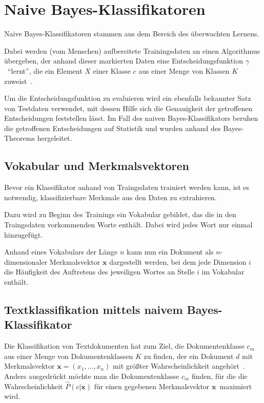\section{Naive Bayes-Klassifikatoren}\label{sec:theory}
    Naive Bayes-Klassifikatoren stammen aus dem Bereich des überwachten Lernens. 

    Dabei werden (vom Menschen) aufbereitete Trainingsdaten an einen Algorithmus übergeben, der anhand dieser markierten Daten eine Entscheidungsfunktion $\gamma$~``lernt'', die ein Element $X$ einer Klasse $c$ aus einer Menge von Klassen $K$ zuweist~\cite{IIR}.

    Um die Entscheidungsfunktion zu evaluieren wird ein ebenfalls bekannter Satz von Testdaten verwendet, mit dessen Hilfe sich die Genauigkeit der getroffenen Entscheidungen feststellen lässt.
    Im Fall des naiven Bayes-Klassifikators beruhen die getroffenen Entscheidungen auf Statistik und wurden anhand des Bayes-Theorems hergeleitet. 

    \subsection{Vokabular und Merkmalsvektoren}\label{sec:vocab}
        Bevor ein Klassifikator anhand von Traingsdaten trainiert werden kann, ist es notwendig, klassifizierbare Merkmale aus den Daten zu extrahieren. 

        Dazu wird zu Beginn des Trainings ein Vokabular gebildet, das die in den Traingsdaten vorkommenden Worte enthält. 
        Dabei wird jedes Wort nur einmal hinzugefügt. 

        Anhand eines Vokabulars der Länge $n$ kann nun ein Dokument als $n$-dimensionaler Merkmalsvektor $\mathbf{x}$ dargestellt werden, bei dem jede Dimension $i$ die Häufigkeit des Auftretens des jeweiligen Wortes an Stelle $i$ im Vokabular enthält.


    \subsection{Textklassifikation mittels naivem Bayes-Klassifikator}
    Die Klassifikation von Textdokumenten hat zum Ziel, die Dokumentenklasse $c_{m}$ aus einer Menge von Dokumentenklassen $K$ zu finden, der ein Dokument $d$ mit Merkmalsvektor $\mathbf{x} = (x_{1},\dots,x_{n})$ mit größter Wahrscheinlichkeit angehört~\cite{IIR}. Anders ausgedrückt möchte man die Dokumentenklasse $c_{m}$ finden, für die die Wahrscheinlichkeit $\hat{P}(c|\mathbf{x})$ für einen gegebenen Merkmalsvektor $\mathbf{x}$~maximiert wird.

